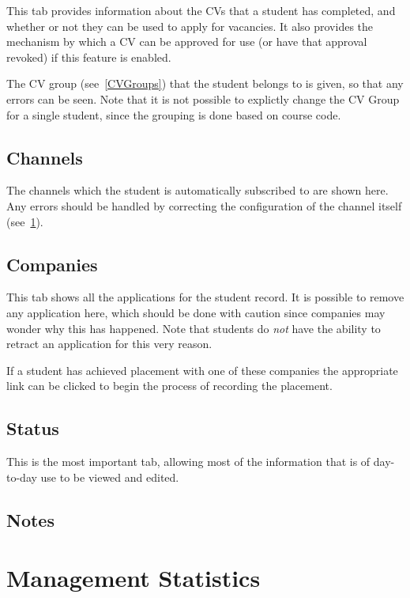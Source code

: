 \documentclass[12 pt]{book}
\begin{document}
This tab provides information about the CVs that a student has completed, and whether or not they can
be used to apply for vacancies. It also provides the mechanism by which a CV can be approved for use
(or have that approval revoked) if this feature is enabled.

The CV group (see~\ref{CVGroups}) that the student belongs to is given, so that any errors can be seen. Note that
it is not possible to explictly change the CV Group for a single student, since the grouping is done based on course code.

\subsection{Channels}

The channels which the student is automatically subscribed to are shown here. Any errors should be handled by correcting the
configuration of the channel itself (see~\ref{}).

\subsection{Companies}

This tab shows all the applications for the student record. It is possible to remove any application here, which should be done with caution
since companies may wonder why this has happened. Note that students do \emph{not} have the ability  to retract an application for this very reason.

If a student has achieved placement with one of these companies the appropriate link can be clicked to begin the process of recording the placement.

\subsection{Status}

This is the most important tab, allowing most of the information that is of day-to-day use to be viewed and edited.

\subsection{Notes}

\section{Management Statistics}
\end{document}
